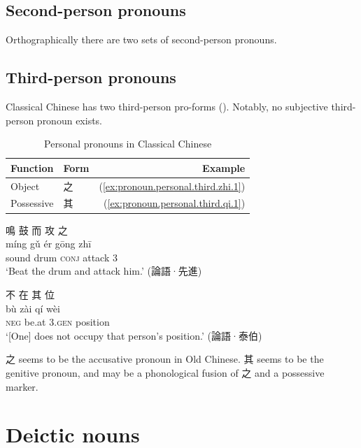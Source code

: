 \documentclass[UTF8, a4paper, oneside, scheme=plain, 12pt]{ctexrep}
\newcommand{\translate}[1]{`#1'}
\newcommand*{\category}[1]{\textsc{#1}}
\begin{document}
\subsection{Second-person pronouns}

Orthographically there are two sets of second-person pronouns.


\subsection{Third-person pronouns}

Classical Chinese has two third-person pro-forms ().
Notably, no subjective third-person pronoun exists.

\begin{table}[H]
    \caption{Personal pronouns in Classical Chinese}
    \label{tbl:third-personal-pronouns}
    \centering
    \begin{tabular}{llr}
        \toprule
        Function & Form & Example \\
        \midrule
        Object &     之 & (\ref{ex:pronoun.personal.third.zhi.1}) \\
        Possessive & 其 & (\ref{ex:pronoun.personal.third.qi.1}) \\
        \bottomrule
    \end{tabular}
\end{table}

\begin{exe}
    \ex\label{ex:pronoun.personal.third.zhi.1}
    \glll 鳴 鼓 而 攻 之 \\
    míng gǔ ér gōng zhī \\
    sound drum \category{conj} attack 3 \\
    \glt\translate{Beat the drum and attack him.} \hfill (論語·先進)

    \ex\label{ex:pronoun.personal.third.qi.1}
    \glll 不 在 其 位 \\
    bù zài qí wèi \\
    \category{neg} be.at 3.\category{gen} position \\
    \glt\translate{[One] does not occupy that person's position.} \hfill (論語·泰伯)
\end{exe}

之 seems to be the accusative pronoun in Old Chinese.
其 seems to be the genitive pronoun,
and may be a phonological fusion of 之 and a possessive marker.

\section{Deictic nouns}
\end{document}
